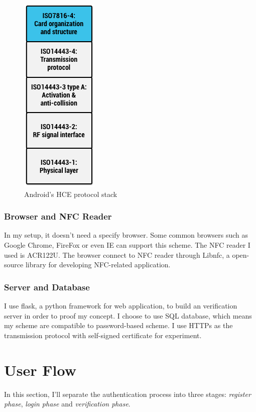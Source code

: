 \begin{CJK}{Bg5}{bsmi}
\begin{figure}
\centering
\includegraphics[scale=0.7]{picture/protocol-stack.png}
\caption{Android's HCE protocol stack\cite{nfc-hce-stack}}
\label{fig:protocol-stack}
\end{figure}

\subsubsection{Browser and NFC Reader}
In my setup, it doesn't need a specify browser. Some common browsers such as Google Chrome, FireFox or even IE can support this scheme. The NFC reader I used is ACR122U. The browser connect to NFC reader through Libnfc\cite{libnfc}, a open-source library for developing NFC-related application.

\subsubsection{Server and Database}

I use flask, a python framework for web application, to build an verification server in order to proof my concept. I choose to use SQL database, which means my scheme are compatible to password-based scheme. I use HTTPs as the transmission protocol with self-signed certificate for experiment. 

\section{User Flow}

In this section, I'll separate the authentication process into three stages: \emph{register phase}, \emph{login phase} and \emph{verification phase}.


\end{CJK}
